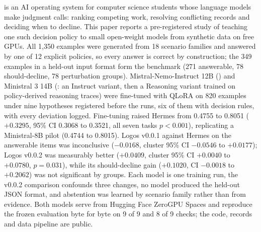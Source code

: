 \kleos{} is an AI operating system for computer science students whose language models make judgment calls: ranking competing work, resolving conflicting records and deciding when to decline. This paper reports a pre-registered study of teaching one such decision policy to small open-weight models from synthetic data on free GPUs. All 1,350 examples were generated from 18 scenario families and answered by one of 12 explicit policies, so every answer is correct by construction; the 349 examples in a held-out input format form the benchmark (271 answerable, 78 should-decline, 78 perturbation groups). Mistral-Nemo-Instruct 12B (\hermes{}) and Ministral 3 14B (\logos{}: an Instruct variant, then a Reasoning variant trained on policy-derived reasoning traces) were fine-tuned with QLoRA on 820 examples under nine hypotheses registered before the runs, six of them with decision rules, with every deviation logged. Fine-tuning raised Hermes from 0.4755 to 0.8051 ($+0.3295$, 95\% CI 0.3068 to 0.3521, all seven tasks $p<0.001$), replicating a Ministral-8B pilot (0.4744 to 0.8015). Logos v0.0.1 against Hermes on the answerable items was inconclusive ($-0.0168$, cluster 95\% CI $-0.0546$ to $+0.0177$); Logos v0.0.2 was measurably better ($+0.0409$, cluster 95\% CI $+0.0040$ to $+0.0780$, $p=0.031$), while its should-decline gain ($+0.1020$, CI $-0.0018$ to $+0.2062$) was not significant by groups. Each model is one training run, the v0.0.2 comparison confounds three changes, no model produced the held-out JSON format, and abstention was learned by scenario family rather than from evidence. Both models serve from Hugging Face ZeroGPU Spaces and reproduce the frozen evaluation byte for byte on 9 of 9 and 8 of 9 checks; the code, records and data pipeline are public.
